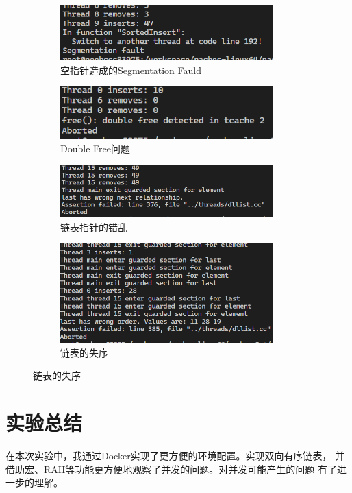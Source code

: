 \documentclass[a4paper,twoside]{article}
\begin{document}
\begin{spacing}{1.2}
\begin{figure}[htb]
	\centering
	\caption{错误信息}
	\label{fig:errors}
	\begin{subfigure}[b]{0.4\textwidth}
		\centering
		\includegraphics[width=0.9\textwidth]{images/segfault.png}
		\caption{空指针造成的Segmentation Fauld}
	\end{subfigure}
	\begin{subfigure}[b]{0.4\textwidth}
		\centering
		\includegraphics[width=0.9\textwidth]{images/dblfree.png}
		\caption{Double Free问题}
	\end{subfigure}
	\begin{subfigure}[b]{0.4\textwidth}
		\centering
		\includegraphics[width=0.9\textwidth]{images/wrongptr.png}
		\caption{链表指针的错乱}
	\end{subfigure}
	\begin{subfigure}[b]{0.4\textwidth}
		\centering
		\includegraphics[width=0.9\textwidth]{images/wrongorder.png}
		\caption{链表的失序}
	\end{subfigure}
\end{figure}

\section{实验总结}

在本次实验中，我通过Docker实现了更方便的环境配置。实现双向有序链表，
并借助宏、RAII等功能更方便地观察了并发的问题。对并发可能产生的问题
有了进一步的理解。

\end{spacing}
\end{document}
